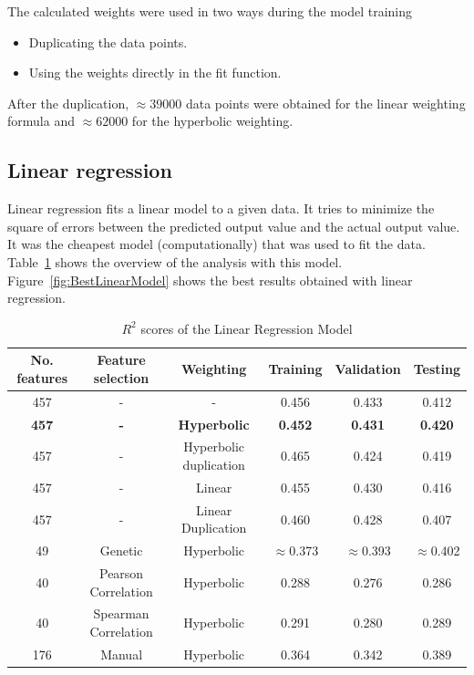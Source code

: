 \documentclass[11pt]{article}
\begin{document}
The calculated weights were used in two ways during the model training

\begin{itemize}
\item Duplicating the data points.
\item Using the weights directly in the fit function.
\end{itemize}

After the duplication, $\approx 39000$ data points were obtained for the linear weighting formula and $\approx 62000$ for the hyperbolic weighting.

\subsection{Linear regression}
Linear regression fits a linear model to a given data.
It tries to minimize the square of errors between the predicted output value and the actual output value.
It was the cheapest model (computationally) that was used to fit the data.
Table~\ref{table:1} shows the overview of the analysis with this model.
Figure~\ref{fig:BestLinearModel} shows the best results obtained with linear regression.

\begin{table} [h!]
\centering
\resizebox{\linewidth}{!} {
\begin{tabular}{ | c | c | c | c | c | c | }
\hline
\textbf{No.  features} & \textbf{Feature selection} & \textbf{Weighting} & \textbf{Training} & \textbf{Validation} & \textbf{Testing} \\ [0.5 ex]
\hline \hline
457 & - & - & 0.456 & 0.433 & 0.412\\
\textbf{457} &  \textbf{-} & \textbf{Hyperbolic} & \textbf{0.452} & \textbf{0.431} & \textbf{0.420}\\
457 & - & Hyperbolic duplication & 0.465 & 0.424 & 0.419\\
457 & - & Linear & 0.455 & 0.430 & 0.416\\
457 & - & Linear Duplication & 0.460 & 0.428 & 0.407\\
49 & Genetic\footnotemark[1] & Hyperbolic & $\approx$0.373 & $\approx$0.393  & $\approx$0.402\\
40 & Pearson Correlation & Hyperbolic & 0.288 & 0.276  & 0.286 \\ 
40 & Spearman Correlation & Hyperbolic & 0.291 & 0.280  & 0.289 \\ 
176 & Manual & Hyperbolic & 0.364  & 0.342  & 0.389\\ [1ex]
\hline
\end{tabular}
}
\caption{$R^2$ scores of the Linear Regression Model}
\label {table:1}
\end{table}
\end{document}
